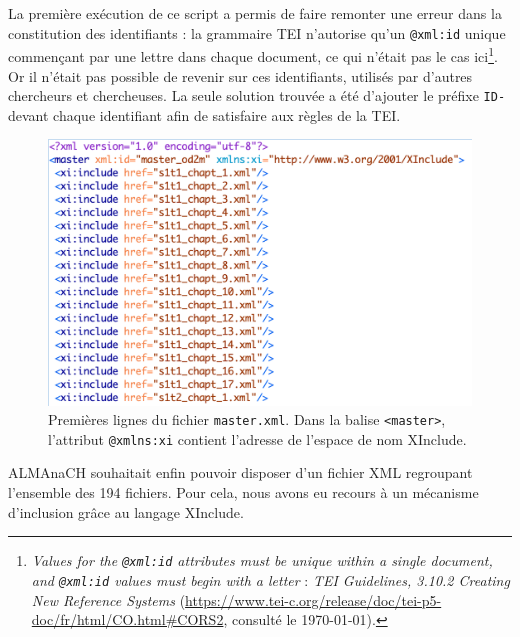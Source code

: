 La première exécution de ce script a permis de faire remonter une erreur dans la constitution des identifiants : la grammaire TEI n'autorise qu'un \texttt{@xml:id} unique commençant par une lettre dans chaque document, ce qui n'était pas le cas ici\footnote{\og \textit{Values for the \texttt{@xml:id} attributes must be unique within a single document, and \texttt{@xml:id} values must begin with a letter}\fg{} : \textit{TEI Guidelines, 3.10.2 Creating New Reference Systems} (\url{https://www.tei-c.org/release/doc/tei-p5-doc/fr/html/CO.html\#CORS2}, consulté le \today).}. Or il n'était pas possible de revenir sur ces identifiants, utilisés par d'autres chercheurs et chercheuses. La seule solution trouvée a été d'ajouter le préfixe \texttt{ID-} devant chaque identifiant afin de satisfaire aux règles de la TEI.

\begin{figure}
    \centering
    \includegraphics[width=15cm]{img/xinclude.png}
    \caption[Premières lignes du fichier \texttt{master.xml}]{Premières lignes du fichier \texttt{master.xml}. Dans la balise \texttt{<master>}, l'attribut \texttt{@xmlns:xi} contient l'adresse de l'espace de nom XInclude.}
    \label{fig:xinclude}
\end{figure}

ALMAnaCH souhaitait enfin pouvoir disposer d'un fichier XML regroupant l'ensemble des 194 fichiers. Pour cela, nous avons eu recours à un mécanisme d'inclusion grâce au langage XInclude.

